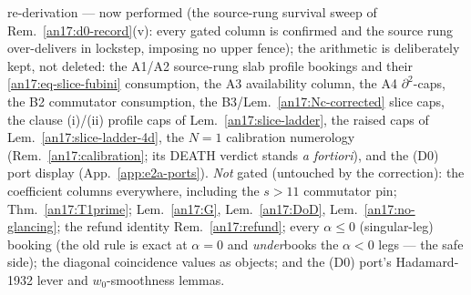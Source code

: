 \begin{remark}
{re-derivation --- now performed (the source-rung survival sweep of
Rem.~\ref{an17:d0-record}(v): every gated column is confirmed and the source
rung over-delivers in lockstep, imposing no upper fence); the arithmetic is
deliberately kept, not deleted:} the A1/A2
source-rung slab profile bookings and their \eqref{an17:eq-slice-fubini}
consumption, the A3 availability column, the A4 $\partial^2$-caps, the B2
commutator consumption, the B3/Lem.~\ref{an17:Nc-corrected} slice caps, the
clause (i)/(ii) profile caps of Lem.~\ref{an17:slice-ladder}, the raised caps
of Lem.~\ref{an17:slice-ladder-4d}, the $N{=}1$ calibration numerology
(Rem.~\ref{an17:calibration}; its DEATH verdict stands \emph{a fortiori}), and
the (D0) port display (App.~\ref{app:e2a-ports}). \emph{Not} gated (untouched
by the correction): the coefficient columns everywhere, including the $s>11$
commutator pin; Thm.~\ref{an17:T1prime}; Lem.~\ref{an17:G},
Lem.~\ref{an17:DoD}, Lem.~\ref{an17:no-glancing}; the refund identity
Rem.~\ref{an17:refund}; every $\alpha\le0$ (singular-leg) booking (the old rule is exact at
$\alpha=0$ and \emph{under}books the $\alpha<0$ legs --- the safe side); the diagonal coincidence values
as objects; and the (D0) port's Hadamard-1932 lever and $w_0$-smoothness
lemmas.
\end{remark}

